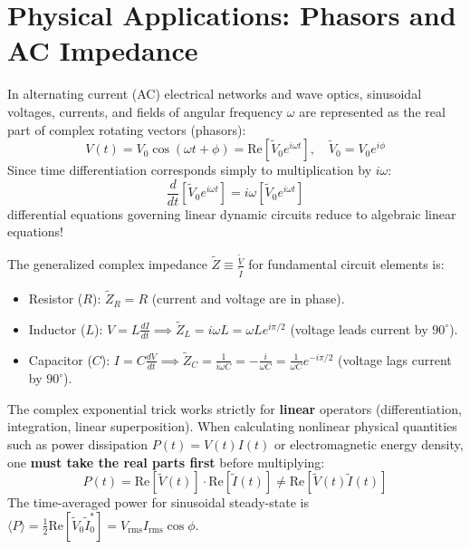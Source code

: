 \section{Physical Applications: Phasors and AC Impedance}
In alternating current (AC) electrical networks and wave optics, sinusoidal voltages, currents, and fields of angular frequency $\omega$ are represented as the real part of complex rotating vectors (phasors):
\begin{equation}
V(t) = V_0 \cos(\omega t + \phi) = \text{Re}\left[\tilde{V}_0 e^{i\omega t}\right], \quad \tilde{V}_0 = V_0 e^{i\phi}
\end{equation}
Since time differentiation corresponds simply to multiplication by $i\omega$:
\begin{equation}
\frac{d}{dt}\left[\tilde{V}_0 e^{i\omega t}\right] = i\omega \left[\tilde{V}_0 e^{i\omega t}\right]
\end{equation}
differential equations governing linear dynamic circuits reduce to algebraic linear equations!

\begin{mathdefinition}
The generalized complex impedance $\tilde{Z} \equiv \frac{\tilde{V}}{\tilde{I}}$ for fundamental circuit elements is:
\begin{itemize}
    \item Resistor ($R$): $\tilde{Z}_R = R$ (current and voltage are in phase).
    \item Inductor ($L$): $V = L\frac{dI}{dt} \implies \tilde{Z}_L = i\omega L = \omega L e^{i\pi/2}$ (voltage leads current by $90^\circ$).
    \item Capacitor ($C$): $I = C\frac{dV}{dt} \implies \tilde{Z}_C = \frac{1}{i\omega C} = -\frac{i}{\omega C} = \frac{1}{\omega C}e^{-i\pi/2}$ (voltage lags current by $90^\circ$).
\end{itemize}
\end{mathdefinition}

\begin{pitfallbox}
The complex exponential trick works strictly for \textbf{linear} operators (differentiation, integration, linear superposition). When calculating nonlinear physical quantities such as power dissipation $P(t) = V(t)I(t)$ or electromagnetic energy density, one \textbf{must take the real parts first} before multiplying:
\begin{equation}
P(t) = \text{Re}[\tilde{V}(t)] \cdot \text{Re}[\tilde{I}(t)] \neq \text{Re}[\tilde{V}(t)\tilde{I}(t)]
\end{equation}
The time-averaged power for sinusoidal steady-state is $\langle P \rangle = \frac{1}{2}\text{Re}[\tilde{V}_0 \tilde{I}_0^*] = V_{\text{rms}} I_{\text{rms}} \cos\phi$.
\end{pitfallbox}

